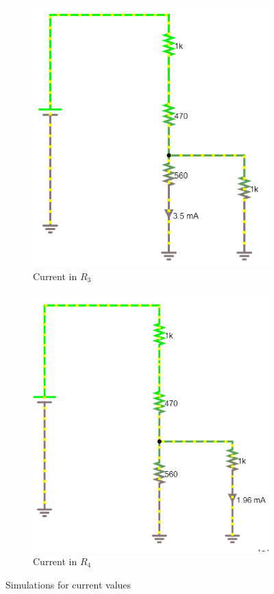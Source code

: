 \documentclass[letterpaper]{article}
\begin{document}
\begin{figure}[H]
\begin{subfigure}{0.48\textwidth}
\includegraphics[width=\linewidth]{sims/IR3}
\caption{Current in $R_3$}
\end{subfigure}
\begin{subfigure}{0.48\textwidth}
\includegraphics[width=\linewidth]{sims/IR4}
\caption{Current in $R_4$}
\end{subfigure}
    \caption{Simulations for current values}
\end{figure}
\end{document}
